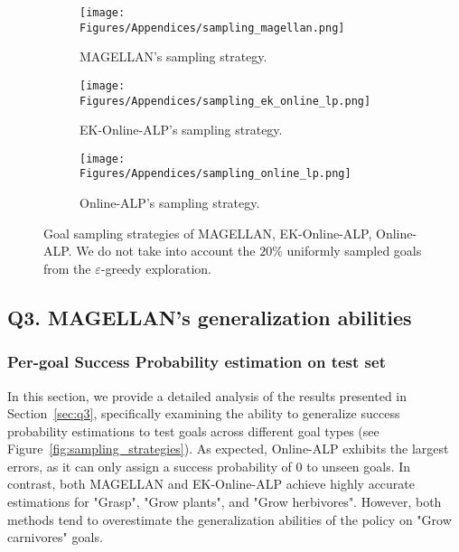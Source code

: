 \begin{figure}[H]
\centering
\begin{subfigure}{.49\textwidth}
    \centering
    \texttt{[image: Figures/Appendices/sampling\_magellan.png]}  
    \caption{MAGELLAN's sampling strategy.}
    \label{fig:MAGELLAN_sampling_strat}
\end{subfigure}
\begin{subfigure}{.49\textwidth}
    \centering
    \texttt{[image: Figures/Appendices/sampling\_ek\_online\_lp.png]}  
    \caption{EK-Online-ALP's sampling strategy.}
    \label{fig:ek_online_lp_sampling_strat}
\end{subfigure}
\begin{subfigure}{.49\textwidth}
    \centering
    \texttt{[image: Figures/Appendices/sampling\_online\_lp.png]}  
    \caption{Online-ALP's sampling strategy.}
    \label{fig:_online_lp_sampling_strat}
\end{subfigure}
\caption{Goal sampling strategies of MAGELLAN, EK-Online-ALP, Online-ALP. We do not take into account the $20\%$ uniformly sampled goals from the $\varepsilon$-greedy exploration.}
\label{fig:sampling_strat}
\end{figure}


\newpage
\subsection{Q3. MAGELLAN’s generalization abilities} \label{app:additional_results_q3}
\subsubsection{Per-goal Success Probability estimation on test set}
\label{app:per_goal_success_probability_ontest_set}

In this section, we provide a detailed analysis of the results presented in Section~\ref{sec:q3}, specifically examining the ability to generalize success probability estimations to test goals across different goal types (see Figure~\ref{fig:sampling_strategies}). As expected, Online-ALP exhibits the largest errors, as it can only assign a success probability of 0 to unseen goals. In contrast, both MAGELLAN and EK-Online-ALP achieve highly accurate estimations for "Grasp", "Grow plants", and "Grow herbivores". However, both methods tend to overestimate the generalization abilities of the policy on "Grow carnivores" goals.

